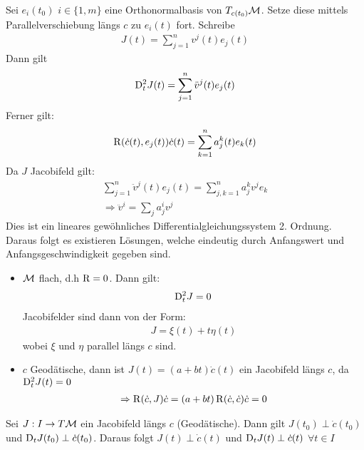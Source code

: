 \begin{bew}
Sei $e_i (t_0)$ $i\in \{ 1, m \}$ eine Orthonormalbasis von $T_{c(t_0)} \mathcal{M}$.
Setze diese mittels Parallelverschiebung längs $c$ zu $e_i(t)$ fort.
Schreibe
\begin{align*}
    J (t) = \sum^n_{j = 1} v^j (t) e_j (t)
\end{align*}
Dann gilt
\begin{align*}
    \mathrm{D}^2_t J(t) = \sum^n_{j=1} \ddot{v}^j (t) e_j (t)
\end{align*}
Ferner gilt:
\begin{align*}
    \operatorname{R}( \dot{c}(t), e_j (t)) \dot{c}(t) = \sum^n_{k=1} a^k_j (t) e_k (t)
\end{align*}
Da $J$ Jacobifeld gilt:
\begin{align*}
    \sum^n_{j=1} \ddot{v}^j (t) e_j(t) = \sum^n_{j,k=1}a^k_j v^j e_k \\
    \Rightarrow \ddot{v}^i = \sum_j a^i_j v^j
\end{align*}
Dies ist ein lineares gewöhnliches Differentialgleichungssystem 2. Ordnung.
Daraus folgt es existieren Lösungen, welche eindeutig durch Anfangswert
und Anfangsgeschwindigkeit gegeben sind.
\end{bew}

\begin{bsp}

\begin{itemize}
\item $\mathcal{M}$ flach, d.h $\operatorname{R} = 0$.
Dann gilt:
\begin{align*}
\mathrm{D}^2_t J = 0
\end{align*}
Jacobifelder sind dann von der Form:
\begin{align*}
J = \xi (t) + t \eta (t)
\end{align*}
wobei $\xi$ und $\eta$ parallel längs $c$ sind.

\item $c$ Geodätische, dann ist $J(t) = (a + bt) \dot{c} (t)$ 
    ein Jacobifeld längs $c$, da $\mathrm{D}^2_t J(t) = 0$
    \begin{align*}
        \Rightarrow \operatorname{R} (\dot{c},J) 
        \dot{c} = (a + bt) \operatorname{R} (\dot{c}, \dot{c})\dot{c} = 0
    \end{align*}
\end{itemize}
\end{bsp}

\begin{lem}
Sei $J : I \to T \mathcal{M}$ ein Jacobifeld längs $c$ (Geodätische).
Dann gilt $J(t_0) \perp \dot{c}(t_0)$ und $\mathrm{D}_t J(t_0) \perp \dot{c}(t_0)$.
Daraus folgt $J(t) \perp \dot{c}(t)$ und $\mathrm{D}_t J(t)\perp\dot{c}(t)$ $\forall t \in I$
\end{lem}

